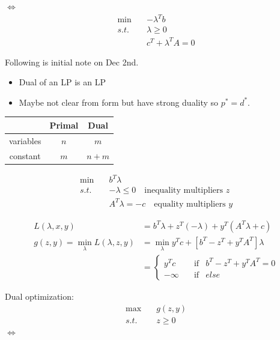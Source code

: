 $\Leftrightarrow$
\begin{align*}
\min\quad &-\lambda^Tb\\
s.t.\quad &\lambda\geq 0\\
&c^T+\lambda^TA=0
\end{align*}





Following is initial note on Dec 2nd.

\begin{itemize}
	\item Dual of an LP is an LP
	
	\item Maybe not clear from form but have strong duality so $p^*=d^*$.
\end{itemize}

\begin{center}
\begin{tabular}{|c|c|c|}
	\hline 
	&Primal & Dual\\
	\hline  
	variables & $n$ & $m$\\
	\hline 
	constant&$m$&$n+m$\\
	\hline 
\end{tabular}
\end{center}


\begin{align*}
\min\quad &b^T\lambda\\
s.t.\quad &-\lambda\leq 0\quad\text{inequality multipliers }z\\
&A^T\lambda = -c\quad \text{equality multipliers }y
\end{align*}

\begin{align*}
L(\lambda,x,y) &= b^T\lambda + z^T(-\lambda)+y^T(A^T\lambda + c)\\
g(z,y) = \min_{\lambda}L(\lambda,z,y) &= \min_{\lambda}y^Tc+[b^T-z^T+y^TA^T]\lambda\\
&=
\left\{
\begin{aligned}
y^Tc &\quad \text{if} &b^T-z^T+y^TA^T=0 \\
-\infty &\quad \text{if} &else
\end{aligned}
\right.
\end{align*}




Dual optimization:
\begin{align*}
\max\quad &g(z,y)\\
s.t.\quad &z \geq 0
\end{align*}
$\Leftrightarrow$



